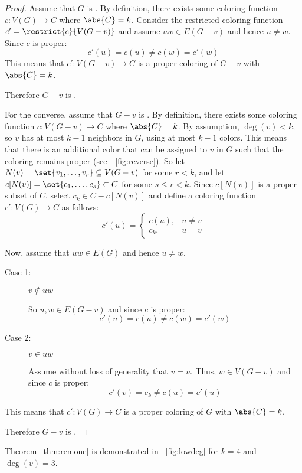 \begin{proof}
  Assume that \(G\) is .  By definition, there exists some coloring function \(c:V(G)\to C\) where
  \(\abs{C}=k\).  Consider the restricted coloring function \(c'=\restrict{c}{V(G-v)}\) and assume \(uw\in E(G-v)\)
  and hence \(u\ne w\).  Since \(c\) is proper:
  \[c'(u)=c(u)\ne c(w)=c'(w)\]
  This means that \(c':V(G-v)\to C\) is a proper coloring of \(G-v\) with \(\abs{C}=k\).

  Therefore \(G-v\) is .

  For the converse, assume that \(G-v\) is .  By definition, there exists some coloring function
  \(c:V(G-v)\to C\) where \(\abs{C}=k\).  By assumption, \(\deg(v)<k\), so \(v\) has at most \(k-1\) neighbors in
  \(G\), using at most \(k-1\) colors.  This means that there is an additional color that can be assigned to \(v\)
  in \(G\) such that the coloring remains proper (see~\figurename~\ref{fig:reverse}).  So let
  \(N(v)=\set{v_1,\ldots,v_r}\subseteq V(G-v)\) for some \(r<k\), and let \(c[N(v)]=\set{c_1,\ldots,c_s}\subset C\)
  for some \(s\le r<k\).  Since \(c[N(v)]\) is a proper subset of \(C\), select \(c_k\in C-c[N(v)]\) and define a
  coloring function \(c':V(G)\to C\) as follows:
  \[c'(u)=\begin{cases}
  c(u), & u\ne v \\
  c_k, & u=v
  \end{cases}\]

  Now, assume that \(uw\in E(G)\) and hence \(u\ne w\).
  \begin{description}
  \item[Case 1:] \(v\notin uw\)

    So \(u,w\in E(G-v)\) and since \(c\) is proper:
    \[c'(u)=c(u)\ne c(w)=c'(w)\]

  \item[Case 2:] \(v\in uw\)

    Assume without loss of generality that \(v=u\).  Thus, \(w\in V(G-v)\) and since \(c\) is proper:
    \[c'(v)=c_k\ne c(u)=c'(u)\]
  \end{description}

  This means that \(c':V(G)\to C\) is a proper coloring of \(G\) with \(\abs{C}=k\).

  Therefore \(G-v\) is .
\end{proof}

Theorem~\ref{thm:remone} is demonstrated in \figurename~\ref{fig:lowdeg} for \(k=4\) and \(\deg(v)=3\).

